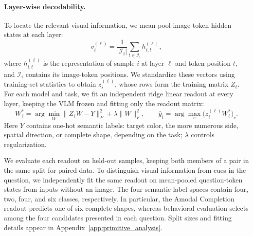 \documentclass{article} %
\begin{document}
\paragraph{Layer-wise decodability.}
To locate the relevant visual information, we mean-pool image-token hidden states at each layer:
\begin{equation}
    v_i^{(\ell)}=\frac{1}{|\mathcal I_i|}
    \sum_{t\in\mathcal I_i}h_{i,t}^{(\ell)},
\end{equation}
where $h_{i,t}^{(\ell)}$ is the representation of sample $i$ at layer $\ell$ and token position $t$, and $\mathcal I_i$ contains its image-token positions. We standardize these vectors using training-set statistics to obtain $z_i^{(\ell)}$, whose rows form the training matrix $Z_\ell$. For each model and task, we fit an independent ridge linear readout at every layer, keeping the VLM frozen and fitting only the readout matrix:
\begin{equation}
    W_\ell^*=\arg\min_W\|Z_\ell W-Y\|_F^2+\lambda\|W\|_F^2,
    \qquad
    \hat y_i=\arg\max_c\bigl(z_i^{(\ell)}W_\ell^*\bigr)_c.
\end{equation}
Here $Y$ contains one-hot semantic labels: target color, the more numerous side, spatial direction, or complete shape, depending on the task; $\lambda$ controls regularization.

We evaluate each readout on held-out samples, keeping both members of a pair in the same split for paired data. To distinguish visual information from cues in the question, we independently fit the same readout on mean-pooled question-token states from inputs without an image. The four semantic label spaces contain four, two, four, and six classes, respectively. In particular, the Amodal Completion readout predicts one of six complete shapes, whereas behavioral evaluation selects among the four candidates presented in each question. Split sizes and fitting details appear in Appendix~\ref{app:primitive_analysis}.
\end{document}
